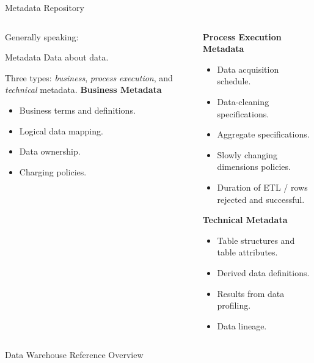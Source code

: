 \begin{frame}{Metadata Repository\footnotemark}
	\begin{columns}
		\begin{column}{0.45\textwidth}
			Generally speaking:

			\begin{block}{Metadata}
				Data about data.
			\end{block}

			Three types: \textit{business}, \textit{process execution}, and
			\textit{technical} metadata.
			\vspace*{0.8em}
			\textbf{Business Metadata}
			\begin{itemize}
				\item Business terms and definitions.
				\item Logical data mapping.
				\item Data ownership.
				\item Charging policies.
			\end{itemize}
		\end{column}

		\begin{column}{0.45\textwidth}
			\textbf{Process Execution Metadata}
			\begin{itemize}
				\item Data acquisition schedule.
				\item Data-cleaning specifications.
				\item Aggregate specifications.
				\item Slowly changing dimensions policies.
				\item Duration of ETL / rows rejected and successful.
			\end{itemize}
			\textbf{Technical Metadata}
			\begin{itemize}
				\item Table structures and table attributes.
				\item Derived data definitions.
				\item Results from data profiling.
				\item Data lineage.
			\end{itemize}

		\end{column}
	\end{columns}

\end{frame}

\begin{frame}{Data Warehouse Reference Overview}
	\vspace*{1cm}
	\centering
	
\end{frame}
